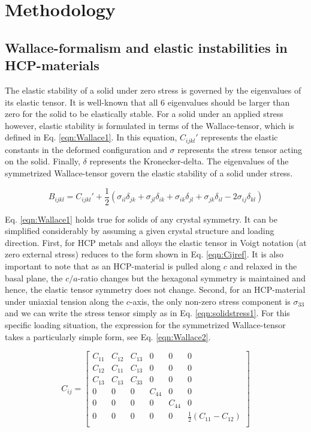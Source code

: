 \documentclass[showpacs,aps,floatfix,prb,reprint,superscriptaddress]{revtex4-1}
\begin{document}
\section{Methodology}
\subsection{Wallace-formalism and elastic instabilities in HCP-materials}
The elastic stability of a solid under zero stress is governed by the eigenvalues of its elastic tensor. It is well-known that all 6 eigenvalues should be larger than zero for the solid to be elastically stable. For a solid under an applied stress however, elastic stability is formulated in terms of the Wallace-tensor, which is defined in Eq. \ref{eqn:Wallace1}. In this equation, $C_{ijkl}'$ represents the elastic constants in the deformed configuration \cite{wallace1998thermodynamics,ray1988elastic,wang1993crystal} and $\sigma$ represents the stress tensor acting on the solid. Finally, $\delta$ represents the Kronecker-delta. The eigenvalues of the symmetrized Wallace-tensor govern the elastic stability of a solid under stress.

\begin{equation}
\label{eqn:Wallace1}
B_{ijkl} = C_{ijkl}' + \frac{1}{2} \left(\sigma_{il} \delta_{jk} + \sigma_{jl} \delta_{ik} + \sigma_{ik} \delta_{jl} + \sigma_{jk} \delta_{il} - 2\sigma_{ij} \delta_{kl} \right)
\end{equation}

Eq. \ref{eqn:Wallace1} holds true for solids of any crystal symmetry. It can be simplified considerably by assuming a given crystal structure and loading direction. First, for HCP metals and alloys the elastic tensor in Voigt notation (at zero external stress) reduces to the form shown in Eq. \ref{eqn:Cijref}. It is also important to note that as an HCP-material is pulled along $c$ and relaxed in the basal plane, the $c/a$-ratio changes but the hexagonal symmetry is maintained and hence, the elastic tensor symmetry does not change. Second, for an HCP-material under uniaxial tension along the $c$-axis, the only non-zero stress component is $\sigma_{33}$ and we can write the stress tensor simply as in Eq. \ref{eqn:solidstress1}. For this specific loading situation, the expression for the symmetrized Wallace-tensor takes a particularly simple form, see Eq. \ref{eqn:Wallace2}.

\begin{equation} 
\label{eqn:Cijref} 
C_{ij} 
=
\left[
\begin{array}{cccccc}
C_{11} & C_{12} & C_{13} & 0 & 0 & 0 \\
C_{12} & C_{11} & C_{13} & 0 & 0 & 0 \\
C_{13} & C_{13} & C_{33} & 0 & 0 & 0 \\
0 & 0 & 0 & C_{44} & 0 & 0 \\
0 & 0 & 0 & 0 & C_{44} & 0 \\
0 & 0 & 0 & 0 & 0 & \frac{1}{2} \left(C_{11}-C_{12} \right)\\
\end{array}
\right]
\end{equation}
\end{document}
